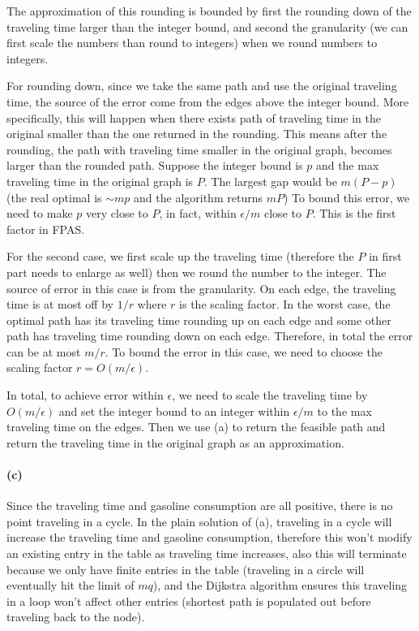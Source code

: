 \documentclass[12pt]{article}
\begin{document}
The approximation of this rounding is bounded by first the rounding down of the traveling time larger than the integer bound, and second the granularity (we can first scale the numbers than round to integers) when we round numbers to integers. 

For rounding down, since we take the same path and use the original traveling time, the source of the error come from the edges above the integer bound. More specifically, this will happen when there exists path of traveling time in the original smaller than the one returned in the rounding. This means after the rounding, the path with traveling time smaller in the original graph, becomes larger than the rounded path. Suppose the integer bound is $p$ and the max traveling time in the original graph is $P$. The largest gap would be $m(P-p)$ (the real optimal is $\sim mp$ and the algorithm returns $mP$) To bound this error, we need to make $p$ very close to $P$, in fact, within $\epsilon/m$ close to $P$. This is the first factor in FPAS.

For the second case, we first scale up the traveling time (therefore the $P$ in first part needs to enlarge as well) then we round the number to the integer. The source of error in this case is from the granularity. On each edge, the traveling time is at most off by $1/r$ where $r$ is the scaling factor. In the worst case, the optimal path has its traveling time rounding up on each edge and some other path has traveling time rounding down on each edge. Therefore, in total the error can be at most $m/r$. To bound the error in this case, we need to choose the scaling factor $r = O(m/\epsilon)$.

In total, to achieve error within $\epsilon$, we need to scale the traveling time by $O(m/\epsilon)$ and set the integer bound to an integer within $\epsilon/m$ to the max traveling time on the edges. Then we use (a) to return the feasible path and return the traveling time in the original graph as an approximation.

\paragraph{(c)} Since the traveling time and gasoline consumption are all positive, there is no point traveling in a cycle. In the plain solution of (a), traveling in a cycle will increase the traveling time and gasoline consumption, therefore this won't modify an existing entry in the table as traveling time increases, also this will terminate because we only have finite entries in the table (traveling in a circle will eventually hit the limit of $mq$), and the Dijkstra algorithm ensures this traveling in a loop won't affect other entries (shortest path is populated out before traveling back to the node).
\end{document}
